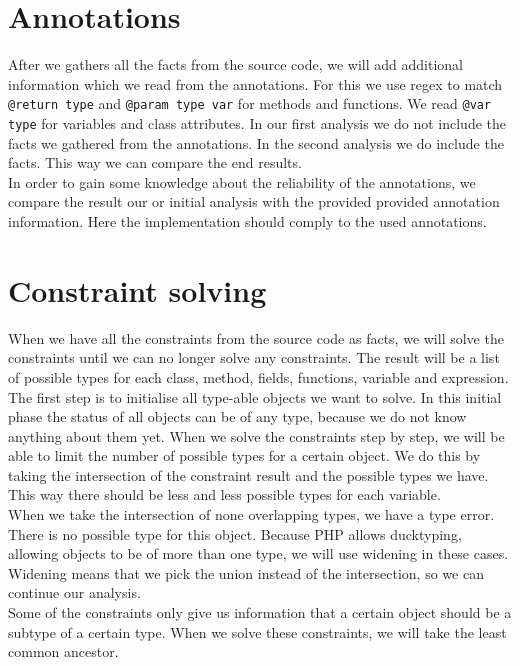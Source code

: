 \documentclass[../main.tex]{subfiles}
\begin{document}
    \section{Annotations}\label{sec:annotations}
    After we gathers all the facts from the source code, we will add additional information which we read from the annotations.
    For this we use regex to match \texttt{@return type} and \texttt{@param type var} for methods and functions.
    We read \texttt{@var type} for variables and class attributes.
    In our first analysis we do not include the facts we gathered from the annotations. 
    In the second analysis we do include the facts.
    This way we can compare the end results.
    \\
    In order to gain some knowledge about the reliability of the annotations, we compare the result our or initial analysis with the provided provided annotation information.
    Here the implementation should comply to the used annotations.
    
    \section{Constraint solving}\label{sec:constraint_solving}
    When we have all the constraints from the source code as facts, we will solve the constraints until we can no longer solve any constraints.
    The result will be a list of possible types for each class, method, fields, functions, variable and expression.
    \\
    The first step is to initialise all type-able objects we want to solve.
    In this initial phase the status of all objects can be of any type, because we do not know anything about them yet.
    When we solve the constraints step by step, we will be able to limit the number of possible types for a certain object.
    We do this by taking the intersection of the constraint result and the possible types we have.
    This way there should be less and less possible types for each variable.
    \\
    When we take the intersection of none overlapping types, we have a type error.
    There is no possible type for this object.
    Because PHP allows ducktyping, allowing objects to be of more than one type, we will use widening in these cases.
    Widening means that we pick the union instead of the intersection, so we can continue our analysis.
    \\
    Some of the constraints only give us information that a certain object should be a subtype of a certain type.
    When we solve these constraints, we will take the least common ancestor.
\end{document}

